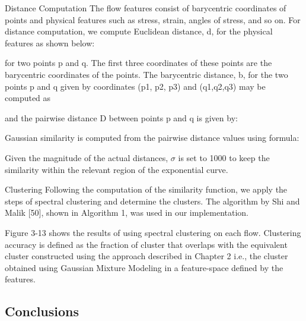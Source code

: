 Distance Computation The ﬂow features consist of barycentric coordinates of points and physical
features such as stress, strain, angles of stress, and so on. For distance computation, we compute Euclidean
distance, d, for the physical features as shown below:


for two points p and q. The ﬁrst three coordinates of these points are the barycentric coordinates of the
points. The barycentric distance, b, for the two points p and q given by coordinates (p1, p2, p3) and
(q1,q2,q3) may be computed as


and the pairwise distance D between points p and q is given by:

Gaussian similarity is computed from the pairwise distance values using formula:


Given the magnitude of the actual distances, $\sigma$ is set to 1000 to keep the similarity within the relevant
region of the exponential curve.

Clustering Following the computation of the similarity function, we apply the steps of spectral
clustering and determine the clusters. The algorithm by Shi and Malik [50], shown in Algorithm 1, was
used in our implementation.

Figure 3-13 shows the results of using spectral clustering on each ﬂow. Clustering accuracy is deﬁned as
the fraction of cluster that overlaps with the equivalent cluster constructed using the approach described in Chapter 2 i.e., the cluster obtained using Gaussian Mixture Modeling in a feature-space deﬁned by the features.



\subsection{Conclusions}

